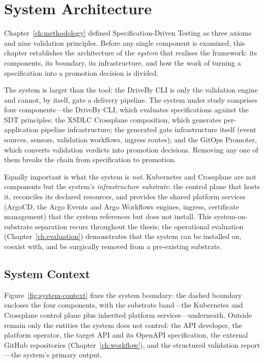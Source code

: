 \chapter{System Architecture}
\label{ch:system-architecture}

Chapter~\ref{ch:methodology} defined Specification-Driven Testing as three axioms and nine validation principles. Before any single component is examined, this chapter establishes the architecture of the \emph{system} that realises the framework: its components, its boundary, its infrastructure, and how the work of turning a specification into a promotion decision is divided.

The system is larger than the tool: the DriveBy CLI is only the validation engine and cannot, by itself, gate a delivery pipeline. The system under study comprises four components---the DriveBy CLI, which evaluates specifications against the SDT principles; the XSDLC Crossplane composition, which generates per-application pipeline infrastructure; the generated gate infrastructure itself (event sources, sensors, validation workflows, ingress routes); and the GitOps Promoter, which converts validation verdicts into promotion decisions. Removing any one of them breaks the chain from specification to promotion.

Equally important is what the system is \emph{not}. Kubernetes and Crossplane are not components but the system's \textit{infrastructure substrate}: the control plane that hosts it, reconciles its declared resources, and provides the shared platform services (ArgoCD, the Argo Events and Argo Workflows engines, ingress, certificate management) that the system references but does not install. This system-on-substrate separation recurs throughout the thesis; the operational evaluation (Chapter~\ref{ch:evaluation}) demonstrates that the system can be installed on, coexist with, and be surgically removed from a pre-existing substrate.

\section{System Context}
\label{sec:system-context}

Figure~\ref{fig:system-context} fixes the system boundary: the dashed boundary encloses the four components, with the substrate band---the Kubernetes and Crossplane control plane plus inherited platform services---underneath. Outside remain only the entities the system does not control: the API developer, the platform operator, the target API and its OpenAPI specification, the external GitHub repositories (Chapter~\ref{ch:workflow}), and the structured validation report---the system's primary output.

